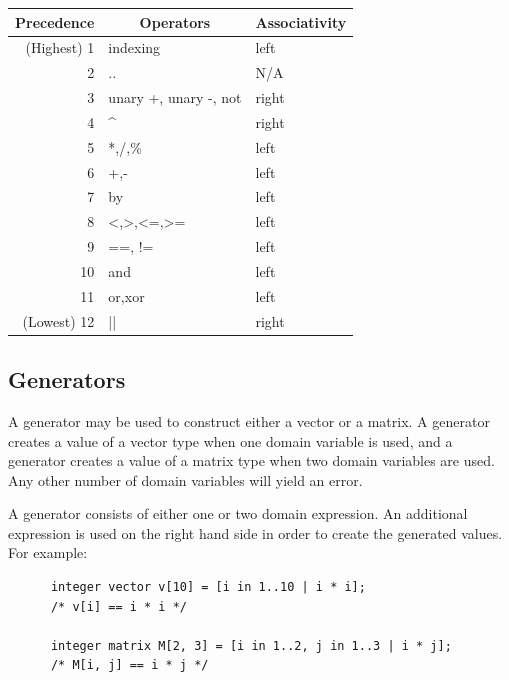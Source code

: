 \documentclass{article}
\begin{document}
    \begin{center}
      \begin{tabular}{|r|l|l|}
        \hline
        \textbf{Precedence} &
        \multicolumn{1}{c}{\textbf{Operators}} &
        \textbf{Associativity} \\
        \hline
        (Highest) 1 & indexing              & left  \\
        2           & ..                    & N/A   \\
        3           & unary +, unary -, not & right \\
        4           & \textasciicircum      & right \\
        5           & *,/,\%                & left  \\
        6           & +,-                   & left  \\
        7           & by                    & left  \\
        8           & <,>,<=,>=             & left  \\
        9           & ==, !=                & left  \\
        10          & and                   & left  \\
        11          & or,xor                & left  \\
        (Lowest) 12 & ||                    & right \\
        \hline
      \end{tabular}
    \end{center}

  \subsection{Generators}\label{sec:generators}

    A generator may be used to construct either a vector or a matrix. A generator creates a value of a vector type
    when one domain variable is used, and a generator creates a value of a matrix type when two domain variables are
    used.  Any other number of domain variables will yield an error.

    A generator consists of either one or two domain expression. An additional expression is used on the right hand
    side in order to create the generated values. For example:

    \begin{lstlisting}
      integer vector v[10] = [i in 1..10 | i * i];
      /* v[i] == i * i */

      integer matrix M[2, 3] = [i in 1..2, j in 1..3 | i * j];
      /* M[i, j] == i * j */
    \end{lstlisting}
\end{document}
